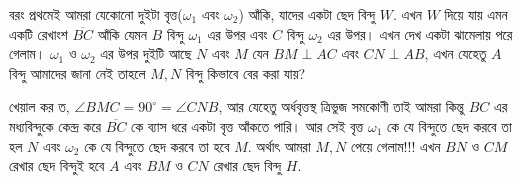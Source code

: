 \documentclass[a4paper,11pt]{article}
\newcommand{\drg}{^{\circ}}
\begin{document}
বরং প্রথমেই আমরা যেকোনো দুইটা বৃত্ত($\omega_1$ এবং $\omega_2$) আঁকি, যাদের একটা ছেদ বিন্দু $W$. এখন $W$ দিয়ে যায় এমন একটি রেখাংশ $\overline{BC}$ আঁকি যেমন $B$ বিন্দু $\omega_1$ এর উপর এবং $C$ বিন্দু $\omega_2$ এর উপর। এখন দেখ একটা ঝামেলায় পরে গেলাম। $\omega_1$ ও $\omega_2$ এর উপর দুইটি আছে $N$ এবং $M$ যেন $BM\perp AC$ এবং $CN \perp AB$, এখন যেহেতু $A$ বিন্দু আমাদের জানা নেই তাহলে $M,N$ বিন্দু কিভাবে বের করা যায়? 

খেয়াল কর ত, $\angle BMC=90\drg=\angle CNB$, আর যেহেতু অর্ধবৃত্তস্থ ত্রিভুজ সমকোণী তাই আমরা কিন্তু $BC$ এর মধ্যবিন্দুকে কেন্দ্র করে $\overline{BC}$ কে ব্যাস ধরে একটা বৃত্ত আঁকতে পারি। আর সেই বৃত্ত $\omega_1$ কে যে বিন্দুতে ছেদ করবে তা হল $N$ এবং $\omega_2$ কে যে বিন্দুতে ছেদ করবে তা হবে $M$. অর্থাৎ আমরা $M,N$ পেয়ে গেলাম!!! এখন $BN$ ও $CM$ রেখার ছেদ বিন্দুই হবে $A$ এবং $BM$ ও $CN$ রেখার ছেদ বিন্দু $H$. 
\end{document}
